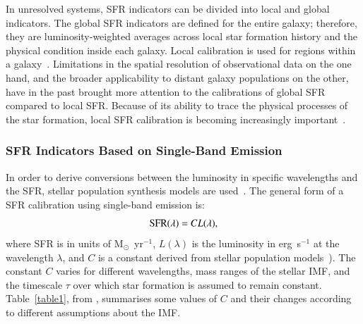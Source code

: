 In unresolved systems, SFR indicators can be divided into local and global indicators. 
The global SFR indicators are defined for the entire galaxy; therefore, they are luminosity-weighted averages across local star formation history and the physical condition inside each galaxy. 
Local calibration is used for regions within a galaxy~\citep[e.g.,][]{Zhu08, Kennicutt09, Boquien10, Boquien11, Hao11}.
Limitations in the spatial resolution of observational data on the one hand, and the broader applicability to distant galaxy populations on the other, have in the past brought more attention to the calibrations of global SFR compared to local SFR. 
Because of its ability to trace the physical processes of the star formation, local SFR calibration is becoming increasingly important~\citep{Calzetti13}.

\subsubsection*{SFR Indicators Based on Single-Band Emission}

In order to derive conversions between the luminosity in specific wavelengths and the SFR, stellar population synthesis models are used~\citep{Kennicutt98b}. 
The general form of a SFR calibration using single-band emission is: 
\begin{equation}
\label{equ: sfrsingle}
{\rm SFR}(\lambda)= CL(\lambda),
\end{equation}
where SFR is in units of M${_\odot}$~yr$^{-1}$, $L(\lambda)$ is the luminosity in erg~s$^{-1}$ at the wavelength $\lambda$, and $C$ is a constant derived from stellar population models~\citep[e.g, starburst99][]{Leitherer99}). 
The constant $C$ varies for different wavelengths, mass ranges of the stellar IMF, and the timescale $\tau$ over which star formation is assumed to remain constant. 
Table~\ref{table1}, from \cite{Calzetti13}, summarises some values of $C$ and their changes according to different assumptions about the IMF. 


